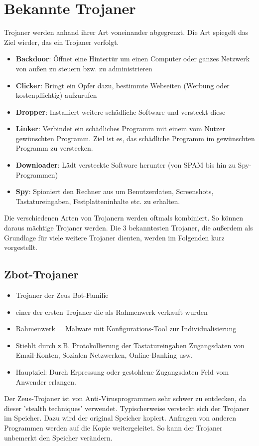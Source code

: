 \section{Bekannte Trojaner}\label{sec:bekannteTrojaner}
Trojaner werden anhand ihrer Art voneinander abgegrenzt. Die Art spiegelt das Ziel wieder, das ein Trojaner verfolgt. 
\begin{itemize}
    \item  \textbf{Backdoor}: Öffnet eine Hintertür um einen Computer oder ganzes Netzwerk von außen zu steuern bzw. zu administrieren
    \item \textbf{Clicker}: Bringt ein Opfer dazu, bestimmte Webseiten (Werbung oder kostenpflichtig) aufzurufen 
    \item \textbf{Dropper}: Installiert weitere schädliche Software und versteckt diese
    \item \textbf{Linker}: Verbindet ein schädliches Programm mit einem vom Nutzer gewünschten Programm. Ziel ist es, das schädliche Programm im gewünschten Programm zu verstecken.
    \item \textbf{Downloader}: Lädt versteckte Software herunter (von SPAM bis hin zu Spy-Programmen)
    \item \textbf{Spy}: Spioniert den Rechner aus um Benutzerdaten, Screenshots, Tastatureingaben, Festplatteninhalte etc. zu erhalten.
\end{itemize}
Die verschiedenen Arten von Trojanern werden oftmals kombiniert. So können daraus mächtige Trojaner werden. 
Die 3 bekanntesten Trojaner, die außerdem als Grundlage für viele weitere Trojaner dienten, werden im Folgenden kurz vorgestellt. 
\subsection{Zbot-Trojaner}
\begin{itemize}
    \item Trojaner der Zeus Bot-Familie
    \item einer der ersten Trojaner die als Rahmenwerk verkauft wurden
    \item Rahmenwerk = Malware mit Konfigurations-Tool zur Individualisierung
    \item Stiehlt durch z.B. Protokollierung der Tastatureingaben Zugangsdaten von Email-Konten, Sozialen Netzwerken, Online-Banking usw.
    \item Hauptziel: Durch Erpressung oder gestohlene Zugangsdaten Feld vom Anwender erlangen.
\end{itemize}
Der Zeus-Trojaner ist von Anti-Virusprogrammen sehr schwer zu entdecken, da dieser 'stealth techniques' verwendet. 
Typischerweise versteckt sich der Trojaner im Speicher. Dazu wird der original Speicher kopiert. Anfragen von anderen Programmen werden auf die Kopie weitergeleitet.
So kann der Trojaner unbemerkt den Speicher verändern.

